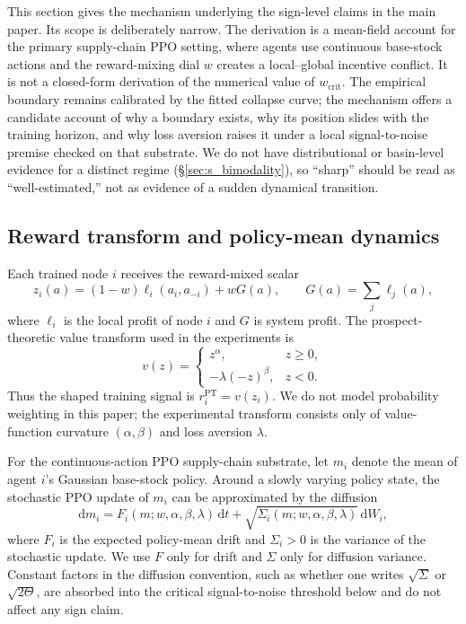 \documentclass[letterpaper]{article} %
\theoremstyle{plain}
\newcommand{\wcrit}{w_{\mathrm{crit}}}
\begin{document}
This section gives the mechanism underlying the sign-level claims in the main paper. Its scope is
deliberately narrow. The derivation is a mean-field account for the primary supply-chain PPO
setting, where agents use continuous base-stock actions and the reward-mixing dial $w$ creates a
local--global incentive conflict. It is not a closed-form derivation of the numerical value of
$\wcrit$. The empirical boundary remains calibrated by the fitted collapse curve; the mechanism offers
a candidate account of why a boundary exists, why its position slides with the training horizon, and
why loss aversion raises it under a local signal-to-noise premise checked on that substrate. We do not
have distributional or basin-level evidence for a distinct regime (\S\ref{sec:s_bimodality}), so
``sharp'' should be read as ``well-estimated,'' not as evidence of a sudden dynamical transition.

\subsection{Reward transform and policy-mean dynamics}
Each trained node $i$ receives the reward-mixed scalar
\begin{equation}
 z_i(a)=(1-w)\ell_i(a_i,a_{-i})+wG(a),\qquad G(a)=\sum_j \ell_j(a),
 \label{eq:blend}
\end{equation}
where $\ell_i$ is the local profit of node $i$ and $G$ is system profit. The prospect-theoretic
value transform used in the experiments is
\begin{equation}
 v(z)=
 \begin{cases}
 z^\alpha, & z\ge 0,\\
 -\lambda(-z)^\beta, & z<0.
 \end{cases}
\end{equation}
Thus the shaped training signal is $r_i^{\mathrm{PT}}=v(z_i)$. We do not model probability
weighting in this paper; the experimental transform consists only of value-function curvature
$(\alpha,\beta)$ and loss aversion $\lambda$.

For the continuous-action PPO supply-chain substrate, let $m_i$ denote the mean of agent $i$'s
Gaussian base-stock policy. Around a slowly varying policy state, the stochastic PPO update of
$m_i$ can be approximated by the diffusion
\begin{equation}
 \mathrm{d}m_i
 =
 F_i(m;w,\alpha,\beta,\lambda)\,\mathrm{d}t
 +
 \sqrt{\Sigma_i(m;w,\alpha,\beta,\lambda)}\,\mathrm{d}W_i ,
 \label{eq:langevin}
\end{equation}
where $F_i$ is the expected policy-mean drift and $\Sigma_i>0$ is the variance of the stochastic
update. We use $F$ only for drift and $\Sigma$ only for diffusion variance. Constant factors in the
diffusion convention, such as whether one writes $\sqrt{\Sigma}$ or $\sqrt{2\Theta}$, are absorbed
into the critical signal-to-noise threshold below and do not affect any sign claim.
\end{document}

